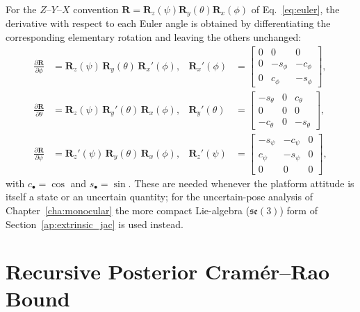 For the $Z$--$Y$--$X$ convention $\bm{R}=\bm{R}_z(\psi)\bm{R}_y(\theta)\bm{R}_x(\phi)$
of Eq.~\eqref{eq:euler}, the derivative with respect to each Euler angle is
obtained by differentiating the corresponding elementary rotation and leaving the
others unchanged:
\begin{align}
  \frac{\partial\bm{R}}{\partial\phi} &= \bm{R}_z(\psi)\,\bm{R}_y(\theta)\,\bm{R}_x'(\phi), &
  \bm{R}_x'(\phi) &= \begin{bmatrix}0&0&0\\0&-s_\phi&-c_\phi\\0&c_\phi&-s_\phi\end{bmatrix},\\
  \frac{\partial\bm{R}}{\partial\theta} &= \bm{R}_z(\psi)\,\bm{R}_y'(\theta)\,\bm{R}_x(\phi), &
  \bm{R}_y'(\theta) &= \begin{bmatrix}-s_\theta&0&c_\theta\\0&0&0\\-c_\theta&0&-s_\theta\end{bmatrix},\\
  \frac{\partial\bm{R}}{\partial\psi} &= \bm{R}_z'(\psi)\,\bm{R}_y(\theta)\,\bm{R}_x(\phi), &
  \bm{R}_z'(\psi) &= \begin{bmatrix}-s_\psi&-c_\psi&0\\c_\psi&-s_\psi&0\\0&0&0\end{bmatrix},
\end{align}
with $c_\bullet=\cos$ and $s_\bullet=\sin$. These are needed whenever the platform
attitude is itself a state or an uncertain quantity; for the uncertain-pose
analysis of Chapter~\ref{cha:monocular} the more compact Lie-algebra
($\mathfrak{se}(3)$) form of Section~\ref{ap:extrinsic_jac} is used instead.

\section{Recursive Posterior Cram\'er--Rao Bound}
\label{ap:crlb}


